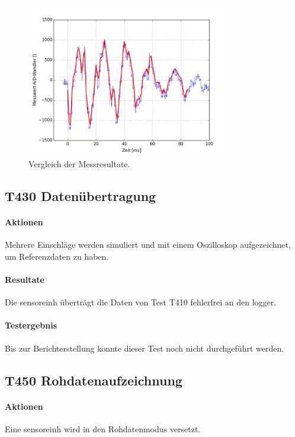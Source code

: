 \begin{figure}
	\centering
		\includegraphics[width=0.8\textwidth]{images/comparison/comparison.png}
	\caption{Vergleich der Messresultate.}
	\label{fig.comparison}
\end{figure}

\subsection{T430 Datenübertragung}
\paragraph{Aktionen} Mehrere Einschläge werden simuliert und mit einem Oszilloskop aufgezeichnet, um Referenzdaten zu haben.

\paragraph{Resultate} Die \gls{sensoreinh} überträgt die Daten von Test T410 fehlerfrei an den \gls{logger}.

\paragraph{Testergebnis} Bis zur Berichterstellung konnte dieser Test noch nicht durchgeführt werden.

\subsection{T450 Rohdatenaufzeichnung}
\paragraph{Aktionen} Eine \gls{sensoreinh} wird in den Rohdatenmodus versetzt.

